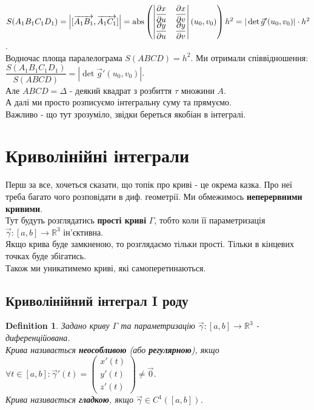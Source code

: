 \documentclass[a4paper, 10pt]{article}
\def\departial#1#2{\dfrac{\partial {#1}}{\partial {#2}}}
\theoremstyle{theoremdd}
\theoremstyle{theoremdd}
\newtheorem{definition}[theorem]{Definition}
\theoremstyle{theoremdd}
\theoremstyle{theoremdd}
\theoremstyle{theoremdd}
\theoremstyle{theoremdd}
\theoremstyle{theoremdd}
\theoremstyle{theoremdd}
\begin{document}
$S(A_1B_1C_1D_1) = \abs{[\overrightarrow{A_1B_1},\overrightarrow{A_1C_1}]} = \text{abs} \left(\begin{vmatrix}
\departial{x}{u} & \departial{x}{v} \\
\departial{y}{u} & \departial{y}{v}
\end{vmatrix} (u_0,v_0) \right) h^2 = |\det \vec{g}'(u_0,v_0)| \cdot h^2$.\\
Водночас площа паралелограма $S(ABCD) = h^2$. Ми отримали співвідношення:\\
$\dfrac{S(A_1B_1C_1D_1)}{S(ABCD)} = |\det \vec{g}'(u_0,v_0)|$.\\
Але $ABCD = \Delta$ - деякий квадрат з розбиття $\tau$ множини $A$.\\
А далі ми просто розписуємо інтегральну суму та прямуємо.\\
Важливо - що тут зрозуміло, звідки береться якобіан в інтегралі.
\newpage
\fi

\newpage
\section{Криволінійні інтеграли}
Перш за все, хочеться сказати, що топік про криві - це окрема казка. Про неї треба багато чого розповідати в диф. геометрії. Ми обмежимось \textbf{неперервними кривими}.\\
Тут будуть розглядатись \textbf{прості криві} $\Gamma$, тобто коли її параметризація $\vec{\gamma}: [a,b] \to \mathbb{R}^3$ ін'єктивна.\\
Якщо крива буде замкненою, то розглядаємо тільки прості. Тільки в кінцевих точках буде збігатись.\\
Також ми уникатимемо криві, які самоперетинаються.

\subsection{Криволінійний інтеграл I роду}
\begin{definition}
Задано криву $\Gamma$ та параметризацію $\vec{\gamma}: [a,b] \to \mathbb{R}^3$ - диференційована.\\
Крива називається \textbf{неособливою} (або \textbf{регулярною}), якщо $\forall t \in [a,b]: \vec{\gamma}'(t) = \begin{pmatrix}
x'(t) \\ y'(t) \\ z'(t)
\end{pmatrix} \neq \vec{0}$.\\
Крива називається \textbf{гладкою}, якщо $\vec{\gamma} \in C^1([a,b])$.
\end{definition}
\end{document}
